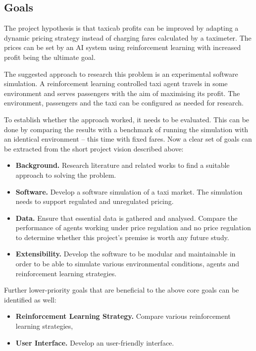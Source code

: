 \subsection{Goals}
\label{sec:intro:goals}

The project hypothesis is that taxicab profits can be improved by adapting a
dynamic pricing strategy instead of charging fares calculated by a taximeter.
The prices can be set by an AI system using reinforcement learning with
increased profit being the ultimate goal. 

The suggested approach to research this problem is an experimental software
simulation. A reinforcement learning controlled taxi agent travels in some
environment and serves passengers with the aim of maximising its profit. The
environment, passengers and the taxi can be configured as needed for research.

To establish whether the approach worked, it needs to be evaluated. This can be
done by comparing the results with a benchmark of running the simulation with an
identical environment -- this time with fixed fares.
Now a clear set of goals can be extracted from the short project vision
described above:

\begin{itemize}
  \item \textbf{Background.} Research literature and related works to find a
        suitable approach to solving the problem.
  \item \textbf{Software.} Develop a software simulation of a taxi market. 
        The simulation needs to support regulated and unregulated pricing.
  \item \textbf{Data.} Ensure that essential data is gathered and analysed.
        Compare the performance of agents working under price regulation and no
        price regulation to determine whether this project's premise is worth
        any future study.
  \item \textbf{Extensibility.} Develop the software to be modular and
        maintainable in order to be able to simulate various environmental
        conditions, agents and reinforcement learning strategies.
\end{itemize}

Further lower-priority goals that are beneficial to the above core goals can be
identified as well:

\begin{itemize}
  \item \textbf{Reinforcement Learning Strategy.} Compare various reinforcement
        learning strategies,
  \item \textbf{User Interface.} Develop an user-friendly interface.
\end{itemize}
